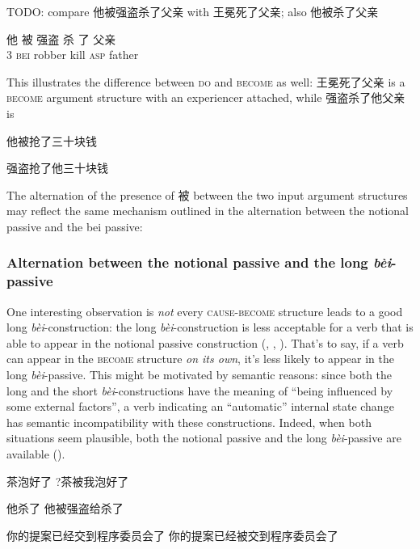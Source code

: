 \documentclass[UTF8, a4paper, oneside, scheme=plain, 12pt]{ctexrep}
\newcommand*{\term}[1]{\emph{#1}}
\newcommand{\form}[1]{\emph{#1}}
\newcommand*{\category}[1]{\textsc{#1}}
\begin{document}
TODO: compare 他被强盗杀了父亲 with 王冕死了父亲; also 他被杀了父亲

\begin{exe}
    \ex\label{ex:verb-phrase.long-bei.external-possession-1} \gll 他 被 强盗 杀 了 父亲 \\
    3 \category{bei} robber kill \category{asp} father \\
\end{exe}

This illustrates the difference between \category{do} and \category{become} as well: 
王冕死了父亲 is a \category{become} argument structure 
with an experiencer attached,
while 强盗杀了他父亲 is 

他被抢了三十块钱 

强盗抢了他三十块钱

The alternation of the presence of 被 between the two input argument structures 
may reflect the same mechanism outlined in the alternation 
between the notional passive and the bei passive:

\subsubsection{Alternation between the notional passive and the long \form{bèi}-passive}
\label{sec:verb-phrase.bei.passive-alternation}

One interesting observation is \emph{not} every \category{cause}-\category{become} structure 
leads to a good long \form{bèi}-construction: 
the long \form{bèi}-construction
is less acceptable for 
a verb that is able to appear in the notional passive construction
(,
,
).
That's to say, 
if a verb can appear in the \category{become} structure \term{on its own},
it's less likely to appear in the long \form{bèi}-passive.
This might be motivated by semantic reasons:
since both the long and the short \form{bèi}-constructions 
have the meaning of ``being influenced by some external factors'',
a verb indicating an ``automatic'' internal state change 
has semantic incompatibility with these constructions. 
Indeed, when both situations seem plausible, 
both the notional passive and the long \form{bèi}-passive 
are available ().

\begin{exe}
    \ex\label{ex:verb-phrase.bei.notional-pass-conflict-1} \begin{xlist}
        \ex 茶泡好了
        \ex ?茶被我泡好了
    \end{xlist}
    \ex\label{ex:verb-phrase.bei.notional-pass-conflict-2} \begin{xlist}
        \ex *他杀了
        \ex 他被强盗给杀了
    \end{xlist}
    \ex\label{ex:verb-phrase.bei.notional-pass-conflict-3} \begin{xlist}
        \ex 你的提案已经交到程序委员会了
        \ex 你的提案已经被交到程序委员会了
    \end{xlist}
\end{exe}
\end{document}
